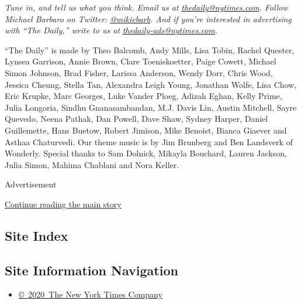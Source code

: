 \emph{Tune in, and tell us what you think. Email us at}
\href{mailto:thedaily@nytimes.com}{\emph{thedaily@nytimes.com}}\emph{.
Follow Michael Barbaro on Twitter:}
\href{https://twitter.com/mikiebarb}{\emph{@mikiebarb}}\emph{. And if
you're interested in advertising with ``The Daily,'' write to us at}
\href{mailto:thedaily-ads@nytimes.com}{\emph{thedaily-ads@nytimes.com}}\emph{.}

``The Daily'' is made by Theo Balcomb, Andy Mills, Lisa Tobin, Rachel
Quester, Lynsea Garrison, Annie Brown, Clare Toeniskoetter, Paige
Cowett, Michael Simon Johnson, Brad Fisher, Larissa Anderson, Wendy
Dorr, Chris Wood, Jessica Cheung, Stella Tan, Alexandra Leigh Young,
Jonathan Wolfe, Lisa Chow, Eric Krupke, Marc Georges, Luke Vander Ploeg,
Adizah Eghan, Kelly Prime, Julia Longoria, Sindhu Gnanasambandan, M.J.
Davis Lin, Austin Mitchell, Sayre Quevedo, Neena Pathak, Dan Powell,
Dave Shaw, Sydney Harper, Daniel Guillemette, Hans Buetow, Robert
Jimison, Mike Benoist, Bianca Giaever and Asthaa Chaturvedi. Our theme
music is by Jim Brunberg and Ben Landsverk of Wonderly. Special thanks
to Sam Dolnick, Mikayla Bouchard, Lauren Jackson, Julia Simon, Mahima
Chablani and Nora Keller.

Advertisement

\protect\hyperlink{after-bottom}{Continue reading the main story}

\hypertarget{site-index}{%
\subsection{Site Index}\label{site-index}}

\hypertarget{site-information-navigation}{%
\subsection{Site Information
Navigation}\label{site-information-navigation}}

\begin{itemize}
\tightlist
\item
  \href{https://help.nytimes.com/hc/en-us/articles/115014792127-Copyright-notice}{©~2020~The
  New York Times Company}
\end{itemize}

